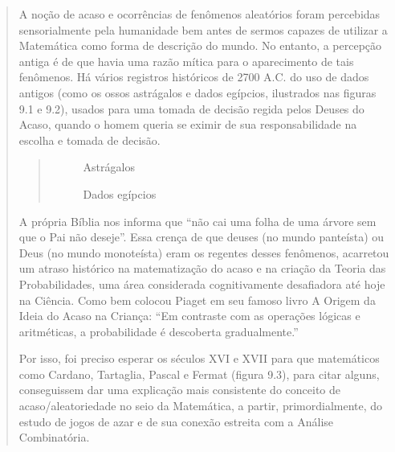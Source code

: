 \begin{quote}

A noção de acaso e ocorrências de fenômenos aleatórios foram percebidas   sensorialmente pela humanidade bem antes de sermos capazes de utilizar a Matemática como forma de descrição do mundo. No entanto, a percepção antiga é de que havia uma razão mítica para o aparecimento de tais fenômenos. Há vários registros históricos de 2700 A.C. do uso de dados antigos (como os ossos astrágalos e dados egípcios, ilustrados nas figuras 9.1 e 9.2), usados para uma tomada de decisão regida pelos Deuses do Acaso, quando o homem queria se eximir de sua responsabilidade na escolha e tomada de decisão.
\begin{quote}

\begin{figure}[H]
\centering
\capstart

\noindent{}
\caption{Astrágalos}\label{\detokenize{PE511-0:id1}}\end{figure}

\begin{figure}[H]
\centering
\capstart

\noindent{}
\caption{Dados egípcios}\label{\detokenize{PE511-0:id2}}\end{figure}
\end{quote}

A própria Bíblia nos informa que  “não cai uma folha de uma árvore sem que o Pai não deseje”. Essa crença de que deuses (no mundo panteísta) ou Deus (no mundo monoteísta) eram os regentes desses fenômenos, acarretou um atraso histórico na matematização do acaso e na criação da Teoria das Probabilidades, uma área considerada cognitivamente desafiadora até hoje na Ciência. Como bem colocou Piaget em seu famoso livro A Origem da Ideia do Acaso na Criança:  “Em contraste com as operações lógicas e aritméticas, a probabilidade é descoberta gradualmente.”

Por isso, foi preciso esperar os séculos XVI e XVII para que matemáticos como Cardano, Tartaglia, Pascal e Fermat (figura 9.3), para citar alguns, conseguissem dar uma explicação mais consistente do conceito de acaso/aleatoriedade no seio da Matemática, a partir, primordialmente, do estudo de jogos de azar e de sua conexão estreita com a Análise Combinatória.
\begin{quote}

\begin{figure}[H]
\centering
\capstart


\end{figure}
\end{quote}
\end{quote}
